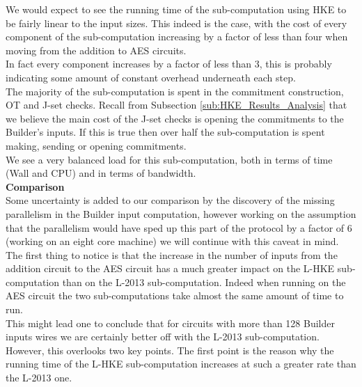 \documentclass[ %
                    author={Nicholas Tutte},
                supervisor={Prof. Nigel Smart},
                    degree={MEng},
                     title={Secure Two Party Computation},
                  subtitle={A practical comparison of recent protocols},
                      type={Research - GG1K},
                      year={2015} ]{dissertation}
\begin{document}
					We would expect to see the running time of the sub-computation using HKE to be fairly linear to the input sizes. This indeed is the case, with the cost of every component of the sub-computation increasing by a factor of less than four when moving from the addition to AES circuits.\\
					
					In fact every component increases by a factor of less than $3$, this is probably indicating some amount of constant overhead underneath each step.\\

					The majority of the sub-computation is spent in the commitment construction, OT and J-set checks. Recall from Subsection \ref{sub:HKE_Results_Analysis} that we believe the main cost of the J-set checks is opening the commitments to the Builder's inputs. If this is true then over half the sub-computation is spent making, sending or opening commitments.\\

					We see a very balanced load for this sub-computation, both in terms of time (Wall and CPU) and in terms of bandwidth.\\

					\noindent \textbf{Comparison}\\

						Some uncertainty is added to our comparison by the discovery of the missing parallelism in the Builder input computation, however working on the assumption that the parallelism would have sped up this part of the protocol by a factor of $6$ (working on an eight core machine) we will continue with this caveat in mind.\\

						The first thing to notice is that the increase in the number of inputs from the addition circuit to the AES circuit has a much greater impact on the L-HKE sub-computation than on the L-2013 sub-computation. Indeed when running on the AES circuit the two sub-computations take almost the same amount of time to run.\\

						This might lead one to conclude that for circuits with more than 128 Builder inputs wires we are certainly better off with the L-2013 sub-computation. However, this overlooks two key points. The first point is the reason why the running time of the L-HKE sub-computation increases at such a greater rate than the L-2013 one.\\
\end{document}
